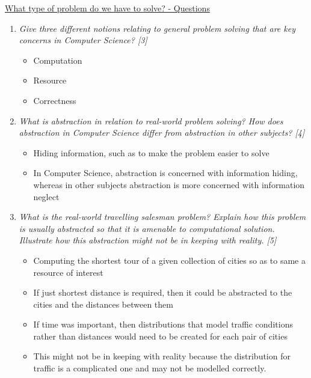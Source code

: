 \documentclass{article}[18pt]
\begin{document}
\begin{center}
\underline{\huge What type of problem do we have to solve? - Questions}
\end{center}
\begin{enumerate}
	\item \textit{Give three different notions relating to general problem solving that are key concerns in Computer Science? [3]}
	\begin{itemize}
		\item Computation
		\item Resource
		\item Correctness
	\end{itemize}	
	\item \textit{What is abstraction in relation to real-world problem solving? How does abstraction in Computer Science differ from abstraction in other subjects? [4]}
	\begin{itemize}
		\item Hiding information, such as to make the problem easier to solve
		\item In Computer Science, abstraction is concerned with information hiding, whereas in other subjects abstraction is more concerned with information neglect
	\end{itemize}
	\item \textit{What is the real-world travelling salesman problem? Explain how this problem is usually abstracted so that it is amenable to computational solution. Illustrate how this abstraction might not be in keeping with reality. [5]}
	\begin{itemize}
		\item Computing the shortest tour of a given collection of cities so as to same a resource of interest
		\item If just shortest distance is required, then it could be abstracted to the cities and the distances between them
		\item If time was important, then distributions that model traffic conditions rather than distances would need to be created for each pair of cities
		\item This might not be in keeping with reality because the distribution for traffic is a complicated one and may not be modelled correctly.
	\end{itemize}
	

\end{enumerate}
\end{document}
